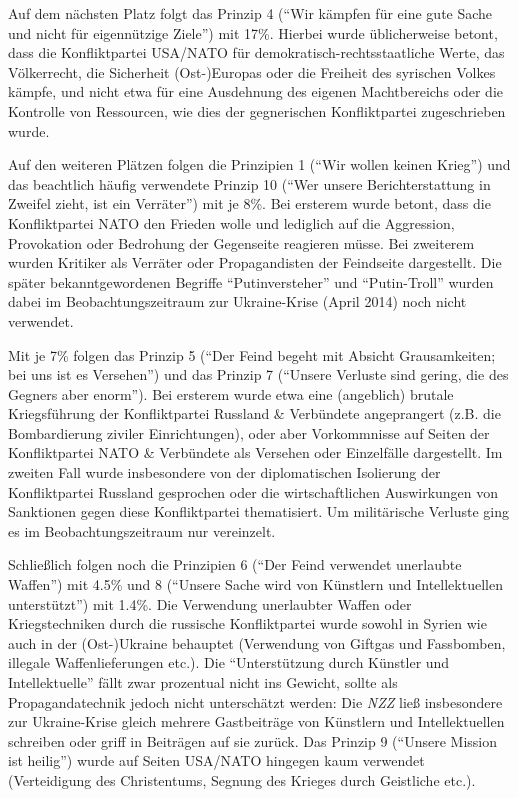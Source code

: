 Auf dem nächsten Platz folgt das Prinzip 4 (``Wir kämpfen für eine gute
Sache und nicht für eigennützige Ziele'') mit 17\%. Hierbei wurde
üblicherweise betont, dass die Konfliktpartei USA/NATO für
demokratisch-rechtsstaatliche Werte, das Völkerrecht, die Sicherheit
(Ost-)Europas oder die Freiheit des syrischen Volkes kämpfe, und nicht
etwa für eine Ausdehnung des eigenen Machtbereichs oder die Kontrolle
von Ressourcen, wie dies der gegnerischen Konfliktpartei zugeschrieben
wurde.

Auf den weiteren Plätzen folgen die Prinzipien 1 (``Wir wollen keinen
Krieg'') und das beachtlich häufig verwendete Prinzip 10 (``Wer unsere
Berichterstattung in Zweifel zieht, ist ein Verräter'') mit je 8\%. Bei
ersterem wurde betont, dass die Konfliktpartei NATO den Frieden wolle
und lediglich auf die Aggression, Provokation oder Bedrohung der
Gegenseite reagieren müsse. Bei zweiterem wurden Kritiker als Verräter
oder Propagandisten der Feindseite dargestellt. Die später
bekanntgewordenen Begriffe ``Putinversteher'' und ``Putin-Troll'' wurden
dabei im Beobachtungs­zeitraum zur Ukraine-Krise (April 2014) noch nicht
verwendet.

Mit je 7\% folgen das Prinzip 5 (``Der Feind begeht mit Absicht
Grausamkeiten; bei uns ist es Versehen'') und das Prinzip 7 (``Unsere
Verluste sind gering, die des Gegners aber enorm''). Bei ersterem wurde
etwa eine (angeblich) brutale Kriegsführung der Konfliktpartei Russland
\& Verbündete angeprangert (z.B. die Bombardierung ziviler
Einrichtungen), oder aber Vorkommnisse auf Seiten der Konfliktpartei
NATO \& Verbündete als Versehen oder Einzelfälle dargestellt. Im zweiten
Fall wurde insbesondere von der diplomatischen Isolierung der
Konfliktpartei Russland gesprochen oder die wirtschaftlichen
Auswirkungen von Sanktionen gegen diese Konfliktpartei thematisiert. Um
militärische Verluste ging es im Beob­ach­tungs­zeitraum nur vereinzelt.

Schließlich folgen noch die Prinzipien 6 (``Der Feind verwendet
unerlaubte Waffen'') mit 4.5\% und 8 (``Unsere Sache wird von Künstlern
und Intellektuellen unterstützt'') mit 1.4\%. Die Verwendung unerlaubter
Waffen oder Kriegstechniken durch die russische Konfliktpartei wurde
sowohl in Syrien wie auch in der (Ost-)Ukraine behauptet (Verwendung von
Giftgas und Fassbomben, illegale Waffenlieferungen etc.). Die
``Unterstützung durch Künstler und Intellektuelle'' fällt zwar
prozentual nicht ins Gewicht, sollte als Propagandatechnik jedoch nicht
unterschätzt werden: Die \emph{NZZ} ließ insbesondere zur Ukraine-Krise
gleich mehrere Gastbeiträge von Künstlern und Intellektuellen schreiben
oder griff in Beiträgen auf sie zurück. Das Prinzip 9 (``Unsere Mission
ist heilig'') wurde auf Seiten USA/NATO hingegen kaum verwendet
(Verteidigung des Christentums, Segnung des Krieges durch Geistliche
etc.).

